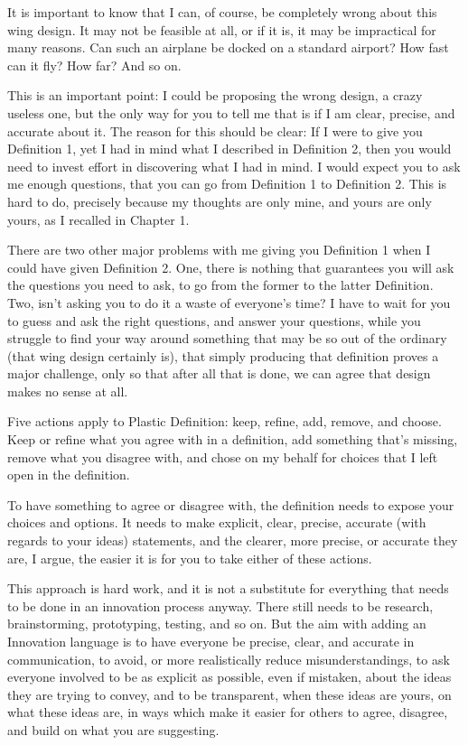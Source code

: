 \documentclass[graybox,envcountchap,sectrefs]{svmono}
\newcommand{\newdef}[1]{Plastic Definition}
\begin{document}
It is important to know that I can, of course, be completely wrong about this wing design. It may not be feasible at all, or if it is, it may be impractical for many reasons. Can such an airplane be docked on a standard airport? How fast can it fly? How far? And so on. 

This is an important point: I could be proposing the wrong design, a crazy useless one, but the only way for you to tell me that is if I am clear, precise, and accurate about it. The reason for this should be clear: If I were to give you Definition 1, yet I had in mind what I described in Definition 2, then you would need to invest effort in discovering what I had in mind. I would expect you to ask me enough questions, that you can go from Definition 1 to Definition 2. This is hard to do, precisely because my thoughts are only mine, and yours are only yours, as I recalled in Chapter 1. 

There are two other major problems with me giving you Definition 1 when I could have given Definition 2. One, there is nothing that guarantees you will ask the questions you need to ask, to go from the former to the latter Definition. Two, isn't asking you to do it a waste of everyone's time? I have to wait for you to guess and ask the right questions, and answer your questions, while you struggle to find your way around something that may be so out of the ordinary (that wing design certainly is), that simply producing that definition proves a major challenge, only so that after all that is done, we can agree that design makes no sense at all. 

Five actions apply to \newdef s: keep, refine, add, remove, and choose. Keep or refine what you agree with in a definition, add something that's missing, remove what you disagree with, and chose on my behalf for choices that I left open in the definition. 

To have something to agree or disagree with, the definition needs to expose your choices and options. It needs to make explicit, clear, precise, accurate (with regards to your ideas) statements, and the clearer, more precise, or accurate they are, I argue, the easier it is for you to take either of these actions.

This approach is hard work, and it is not a substitute for everything  that needs to be done in an innovation process anyway. There still needs to be research, brainstorming, prototyping, testing, and so on. But the aim with adding an Innovation  language is to have everyone be precise, clear, and accurate in communication, to avoid, or more realistically reduce misunderstandings, to ask everyone involved to be as explicit as possible, even if mistaken, about the ideas they are trying to convey, and to be transparent, when these ideas are yours, on what these ideas are, in ways which make it easier for others to agree, disagree, and build on what you are suggesting.
\end{document}
